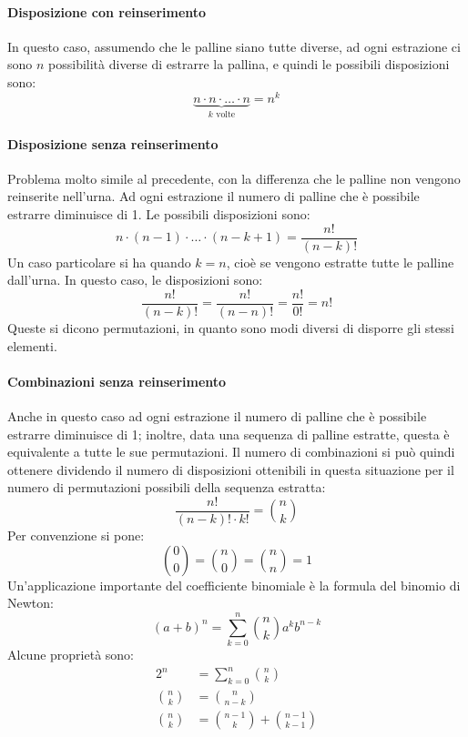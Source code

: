 \documentclass{article}
\theoremstyle{plain}
\theoremstyle{definition}
\theoremstyle{remark}
\begin{document}
\paragraph{Disposizione con reinserimento} %
\label{par:disposizione_con_reinserimento}
In questo caso, assumendo che le palline siano tutte diverse, ad ogni estrazione ci sono $n$ possibilità diverse di estrarre la pallina, e quindi le possibili disposizioni sono:
\begin{equation*}
	\underbrace{n\cdot n\cdot \ldots \cdot n}_{k \text{ volte}} = n^k
\end{equation*}
\paragraph{Disposizione senza reinserimento} %
\label{par:disposizione_senza_reinserimento}
Problema molto simile al precedente, con la differenza che le palline non vengono reinserite nell'urna. Ad ogni estrazione il numero di palline che è possibile estrarre diminuisce di 1. Le possibili disposizioni sono:
\begin{equation*}
	n\cdot (n-1) \cdot \ldots\cdot(n-k+1) = \frac{n!}{(n-k)!}
\end{equation*}
Un caso particolare si ha quando $k=n$, cioè se vengono estratte tutte le palline dall'urna. In questo caso, le disposizioni sono:
\begin{equation*}
	\frac{n!}{(n-k)!}=\frac{n!}{(n-n)!}=\frac{n!}{0!}=n!
\end{equation*}
Queste si dicono permutazioni, in quanto sono modi diversi di disporre gli stessi elementi.
\paragraph{Combinazioni senza reinserimento} %
\label{par:combinazioni_senza_reinserimento}
Anche in questo caso ad ogni estrazione il numero di palline che è possibile estrarre diminuisce di 1; inoltre, data una sequenza di palline estratte, questa è equivalente a tutte le sue permutazioni. Il numero di combinazioni si può quindi ottenere dividendo il numero di disposizioni ottenibili in questa situazione per il numero di permutazioni possibili della sequenza estratta:
\begin{equation*}
	\frac{n!}{(n-k)!\cdot k!}=\binom{n}{k}
\end{equation*}
Per convenzione si pone:
\begin{equation*}
	\binom{0}{0}=\binom{n}{0}=\binom{n}{n}=1
\end{equation*}
Un'applicazione importante del coefficiente binomiale è la formula del binomio di Newton:
\begin{equation*}
	(a+b)^n=\sum_{k=0}^n \binom{n}{k} a^k b^{n-k}
\end{equation*}
Alcune proprietà sono:
\begin{align*}
	2^n&=\sum_{k=0}^n \binom{n}{k}\\
	\binom{n}{k}&=\binom{n}{n-k}\\
	\binom{n}{k}&=\binom{n-1}{k}+\binom{n-1}{k-1}
\end{align*}
\end{document}
